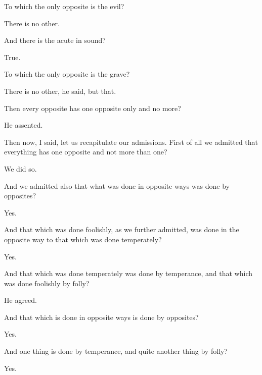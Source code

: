 \documentclass[11pt,letter]{article}
\begin{document}
\par  To which the only opposite is the evil?

\par  There is no other.

\par  And there is the acute in sound?

\par  True.

\par  To which the only opposite is the grave?

\par  There is no other, he said, but that.

\par  Then every opposite has one opposite only and no more?

\par  He assented.

\par  Then now, I said, let us recapitulate our admissions. First of all we admitted that everything has one opposite and not more than one?

\par  We did so.

\par  And we admitted also that what was done in opposite ways was done by opposites?

\par  Yes.

\par  And that which was done foolishly, as we further admitted, was done in the opposite way to that which was done temperately?

\par  Yes.

\par  And that which was done temperately was done by temperance, and that which was done foolishly by folly?

\par  He agreed.

\par  And that which is done in opposite ways is done by opposites?

\par  Yes.

\par  And one thing is done by temperance, and quite another thing by folly?

\par  Yes.
\end{document}
